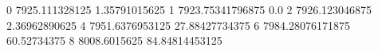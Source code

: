 0 7925.111328125 1.35791015625
1 7923.75341796875 0.0
2 7926.123046875 2.36962890625
4 7951.6376953125 27.88427734375
6 7984.28076171875 60.52734375
8 8008.6015625 84.84814453125
